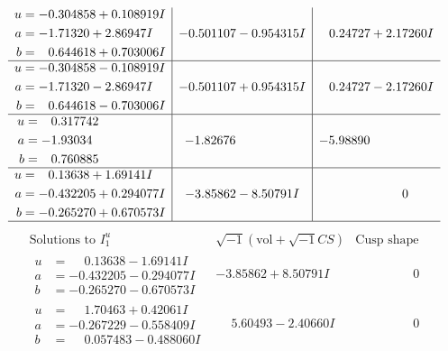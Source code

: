\documentclass[1p]{elsarticle_modified}
\theoremstyle{definition}
\newcommand{\I}{\sqrt{-1}}
\begin{document}
$$\begin{array}{c|c|c}
\begin{aligned}
u &= -0.304858 + 0.108919 I \\
a &= -1.71320 + 2.86947 I \\
b &= \phantom{-}0.644618 + 0.703006 I\end{aligned}
 & -0.501107 - 0.954315 I & \phantom{-}0.24727 + 2.17260 I \\ \hline\begin{aligned}
u &= -0.304858 - 0.108919 I \\
a &= -1.71320 - 2.86947 I \\
b &= \phantom{-}0.644618 - 0.703006 I\end{aligned}
 & -0.501107 + 0.954315 I & \phantom{-}0.24727 - 2.17260 I \\ \hline\begin{aligned}
u &= \phantom{-}0.317742\phantom{ +0.000000I} \\
a &= -1.93034\phantom{ +0.000000I} \\
b &= \phantom{-}0.760885\phantom{ +0.000000I}\end{aligned}
 & -1.82676\phantom{ +0.000000I} & -5.98890\phantom{ +0.000000I} \\ \hline\begin{aligned}
u &= \phantom{-}0.13638 + 1.69141 I \\
a &= -0.432205 + 0.294077 I \\
b &= -0.265270 + 0.670573 I\end{aligned}
 & -3.85862 - 8.50791 I & \phantom{-0.000000 } 0\\
 \hline 
 \end{array}$$\newpage$$\begin{array}{c|c|c}  
\text{Solutions to }I^u_{1}& \I (\text{vol} + \sqrt{-1}CS) & \text{Cusp shape}\\
 \hline 
\begin{aligned}
u &= \phantom{-}0.13638 - 1.69141 I \\
a &= -0.432205 - 0.294077 I \\
b &= -0.265270 - 0.670573 I\end{aligned}
 & -3.85862 + 8.50791 I & \phantom{-0.000000 } 0 \\ \hline\begin{aligned}
u &= \phantom{-}1.70463 + 0.42061 I \\
a &= -0.267229 - 0.558409 I \\
b &= \phantom{-}0.057483 - 0.488060 I\end{aligned}
 & \phantom{-}5.60493 - 2.40660 I & \phantom{-0.000000 } 0 \\ \hline\begin{aligned}

\end{aligned}
\end{array}$$
\end{document}
